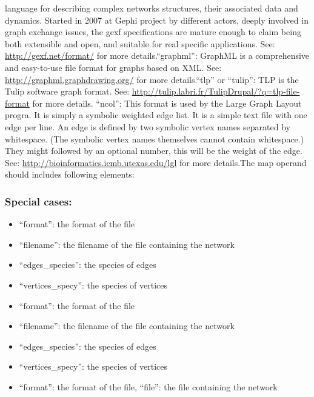 \documentclass[]{book}
\providecommand{\tightlist}{%
  \setlength{\itemsep}{0pt}\setlength{\parskip}{0pt}}
\theoremstyle{definition}
\theoremstyle{definition}
\theoremstyle{definition}
\theoremstyle{remark}
\begin{document}
language for describing complex networks structures, their associated
data and dynamics. Started in 2007 at Gephi project by different actors,
deeply involved in graph exchange issues, the gexf specifications are
mature enough to claim being both extensible and open, and suitable for
real specific applications. See: \url{http://gexf.net/format/} for more
details.``graphml'': GraphML is a comprehensive and easy-to-use file
format for graphs based on XML. See:
\url{http://graphml.graphdrawing.org/} for more details.``tlp'' or
``tulip'': TLP is the Tulip software graph format. See:
\url{http://tulip.labri.fr/TulipDrupal/?q=tlp-file-format} for more
details. ``ncol'': This format is used by the Large Graph Layout progra.
It is simply a symbolic weighted edge list. It is a simple text file
with one edge per line. An edge is defined by two symbolic vertex names
separated by whitespace. (The symbolic vertex names themselves cannot
contain whitespace.) They might followed by an optional number, this
will be the weight of the edge. See:
\url{http://bioinformatics.icmb.utexas.edu/lgl} for more details.The map
operand should includes following elements:

\subsubsection{Special cases:}\label{special-cases-91}

\begin{itemize}
\tightlist
\item
  ``format'': the format of the file\\
\item
  ``filename'': the filename of the file containing the network\\
\item
  ``edges\_species'': the species of edges\\
\item
  ``vertices\_specy'': the species of vertices\\
\item
  ``format'': the format of the file\\
\item
  ``filename'': the filename of the file containing the network\\
\item
  ``edges\_species'': the species of edges\\
\item
  ``vertices\_specy'': the species of vertices\\
\item
  ``format'': the format of the file, ``file'': the file containing the
  network
\end{itemize}
\end{document}
